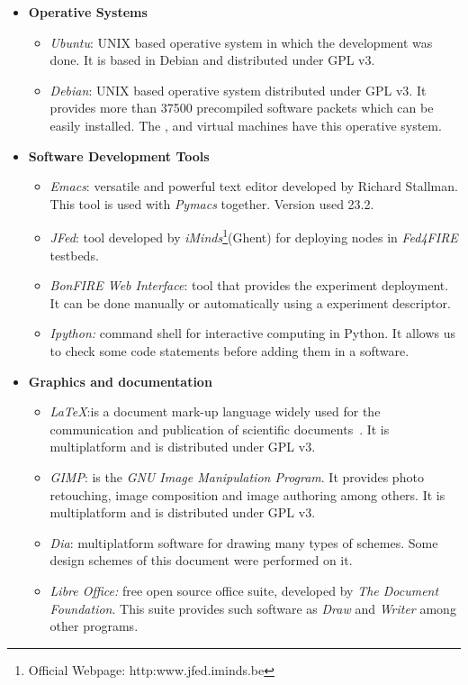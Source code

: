 \begin{itemize}
\item \textbf{Operative Systems}
\begin{itemize}
\item{\emph{Ubuntu}}: UNIX based operative system in which the development was done. It
  is based in Debian and distributed under \ac{GPL} v3.
\item{\emph{Debian}}: UNIX based operative system distributed under \ac{GPL}
  v3. It provides more than 37500 precompiled software packets which can be
  easily installed. The \bonfire, \vw and \pl virtual machines have this operative system.
\end{itemize}


\item \textbf{Software Development Tools}

\begin{itemize}
\item{\emph{Emacs}}: versatile and powerful text editor developed by Richard
  Stallman. This tool is used with \emph{Pymacs} together. Version used 23.2.
\item{\emph{JFed}}: tool developed by \emph{iMinds}\footnote{Official Webpage: http:www.jfed.iminds.be}(Ghent) for deploying nodes in
  \emph{Fed4FIRE} testbeds. 
\item{\emph{BonFIRE Web Interface}}: \bonfire tool that provides the experiment
  deployment. It can be done manually or automatically using a experiment descriptor.
\item \emph{Ipython:}  command shell for interactive computing in Python. It
  allows us to check some code statements before adding them in a software.
\end{itemize}


\item \textbf{Graphics and documentation}

\begin{itemize}
\item{\emph{\LaTeX}}:is a document mark-up language widely used for the
  communication and publication of scientific documents~\cite{Oetiker2014}. It is multiplatform and is distributed under \ac{GPL} v3.
\item{\emph{GIMP}}: is the \emph{GNU Image Manipulation Program}. It provides photo retouching, image composition and image authoring among
  others. It is multiplatform and is distributed under \ac{GPL} v3.
\item{\emph{Dia}}: multiplatform software for drawing many types of
  schemes. Some design schemes of this document were performed on it.
\item \emph{Libre Office:} free open source office suite, developed by \emph{The
      Document Foundation}. This suite provides such software as \emph{Draw} and
    \emph{Writer} among other programs. 
\end{itemize}


\end{itemize}
